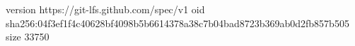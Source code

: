 version https://git-lfs.github.com/spec/v1
oid sha256:04f3ef1f4c40628bf4098b5b6614378a38c7b04bad8723b369ab0d2fb857b505
size 33750
